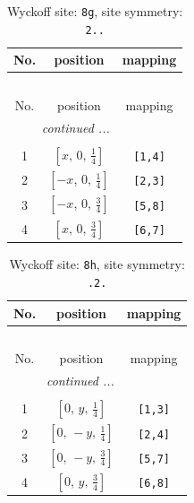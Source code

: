 \documentclass[fleqn,8pt]{jsarticle}
\begin{document}
\begin{longtable}{ccc}
\caption{Wyckoff site: {\tt 8g}, site symmetry: {\tt 2..}}
 \\
 \hline \hline
No. & position & mapping \\ \hline \endfirsthead

\multicolumn{2}{l}{\tablename\ \thetable{}} \\
 \hline \hline
No. & position & mapping \\ \hline \endhead

 \hline \hline
\multicolumn{2}{r}{\footnotesize\it continued ...} \\ \endfoot

 \hline \hline
\multicolumn{2}{r}{} \\ \endlastfoot

1 & $\left[ x,\, 0,\, \frac{1}{4} \right]$ & {\tt [1,4]} \\ \hline
2 & $\left[ - x,\, 0,\, \frac{1}{4} \right]$ & {\tt [2,3]} \\ \hline
3 & $\left[ - x,\, 0,\, \frac{3}{4} \right]$ & {\tt [5,8]} \\ \hline
4 & $\left[ x,\, 0,\, \frac{3}{4} \right]$ & {\tt [6,7]} \\
\end{longtable}
\renewcommand{\arraystretch}{1.2}
\begin{longtable}{ccc}
\caption{Wyckoff site: {\tt 8h}, site symmetry: {\tt .2.}}
 \\
 \hline \hline
No. & position & mapping \\ \hline \endfirsthead

\multicolumn{2}{l}{\tablename\ \thetable{}} \\
 \hline \hline
No. & position & mapping \\ \hline \endhead

 \hline \hline
\multicolumn{2}{r}{\footnotesize\it continued ...} \\ \endfoot

 \hline \hline
\multicolumn{2}{r}{} \\ \endlastfoot

1 & $\left[ 0,\, y,\, \frac{1}{4} \right]$ & {\tt [1,3]} \\ \hline
2 & $\left[ 0,\, - y,\, \frac{1}{4} \right]$ & {\tt [2,4]} \\ \hline
3 & $\left[ 0,\, - y,\, \frac{3}{4} \right]$ & {\tt [5,7]} \\ \hline
4 & $\left[ 0,\, y,\, \frac{3}{4} \right]$ & {\tt [6,8]} \\
\end{longtable}
\end{document}
